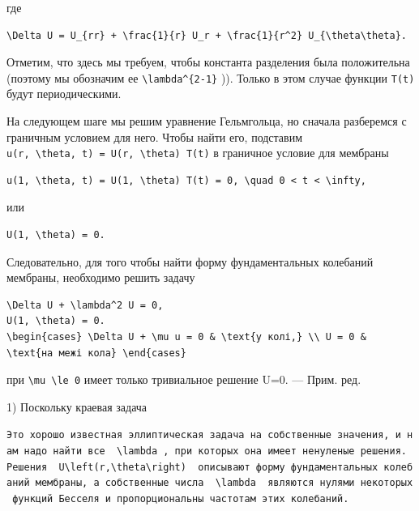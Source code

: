 \documentclass[
  ukrainian,
]{article}
\begin{document}
где

\begin{verbatim}
\Delta U = U_{rr} + \frac{1}{r} U_r + \frac{1}{r^2} U_{\theta\theta}.
\end{verbatim}

Отметим, что здесь мы требуем, чтобы константа разделения была
положительна (поэтому мы обозначим ее
\texttt{\textbackslash{}lambda\^{}\{2-1\}} )). Только в этом случае
функции \texttt{T(t)} будут периодическими.

На следующем шаге мы решим уравнение Гельмгольца, но сначала разберемся
с граничным условием для него. Чтобы найти его, подставим
\texttt{u(r,\ \textbackslash{}theta,\ t)\ =\ U(r,\ \textbackslash{}theta)\ T(t)}
в граничное условие для мембраны

\begin{verbatim}
u(1, \theta, t) = U(1, \theta) T(t) = 0, \quad 0 < t < \infty,
\end{verbatim}

или

\begin{verbatim}
U(1, \theta) = 0.
\end{verbatim}

Следовательно, для того чтобы найти форму фундаментальных колебаний
мембраны, необходимо решить задачу

\begin{verbatim}
\Delta U + \lambda^2 U = 0,
U(1, \theta) = 0.
\begin{cases} \Delta U + \mu u = 0 & \text{у колі,} \\ U = 0 & \text{на межі кола} \end{cases}
\end{verbatim}

при \texttt{\textbackslash{}mu\ \textbackslash{}le\ 0} имеет только
тривиальное решение U=0. --- Прим. ред.

1) Поскольку краевая задача

\texttt{Это\ хорошо\ известная\ эллиптическая\ задача\ на\ собственные\ значения,\ и\ нам\ надо\ найти\ все\ \ \textquotesingle{}\textbackslash{}lambda\textquotesingle{}\ ,\ при\ которых\ она\ имеет\ ненуленые\ решения.\ Решения\ \ \textquotesingle{}U\textbackslash{}left(r,\textbackslash{}theta\textbackslash{}right)\textquotesingle{}\ \ описывают\ форму\ фундаментальных\ колебаний\ мембраны,\ а\ собственные\ числа\ \ \textquotesingle{}\textbackslash{}lambda\textquotesingle{}\ \ являются\ нулями\ некоторых\ функций\ Бесселя\ и\ пропорциональны\ частотам\ этих\ колебаний.}
\end{document}
